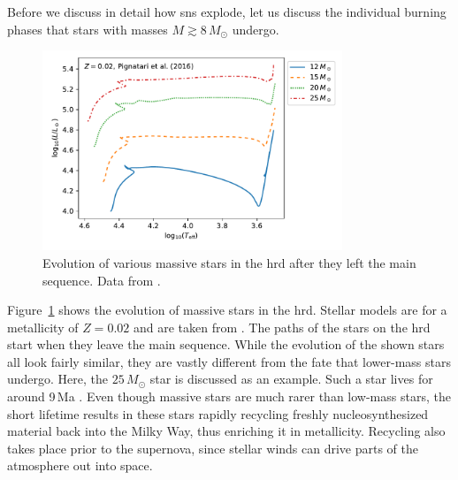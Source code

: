 Before we discuss in detail how \acp{sn} explode, let us discuss the individual burning phases that stars with masses $M \gtrsim 8\,M_\odot$ undergo.
\begin{figure}[tb]
    \centering
    \includegraphics[width=0.8\textwidth]{graphics/massive_stars/hrd_massive_stars}
    \caption{Evolution of various massive stars in the \ac{hrd} after they left the main sequence. Data from \citet{pignatari16}.}
    \label{fig:massive_stars:hrds_pignatari_nugrid_set1.2}
\end{figure}
Figure~\ref{fig:massive_stars:hrds_pignatari_nugrid_set1.2} shows the evolution of massive stars in the \ac{hrd}. Stellar models are for a metallicity of $Z=0.02$ and are taken from \citet{pignatari16}. The paths of the stars on the \ac{hrd} start when they leave the main sequence. While the evolution of the shown stars all look fairly similar, they are vastly different from the fate that lower-mass stars undergo. Here, the $25\,M_\odot$ star is discussed as an example. Such a star lives for around 9\,Ma \citep{meynet03}. Even though massive stars are much rarer than low-mass stars, the short lifetime results in these stars rapidly recycling freshly nucleosynthesized material back into the Milky Way, thus enriching it in metallicity. Recycling also takes place prior to the supernova, since stellar winds can drive parts of the atmosphere out into space. 

\begin{table}[b]
\end{table}

